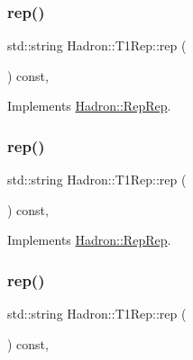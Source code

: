 \subsubsection{\texorpdfstring{rep()}{rep()}\hspace{0.1cm}{\footnotesize\ttfamily [1/5]}}
{\footnotesize\ttfamily std\+::string Hadron\+::\+T1\+Rep\+::rep (\begin{DoxyParamCaption}{ }\end{DoxyParamCaption}) const\hspace{0.3cm}{\ttfamily [inline]}, {\ttfamily [virtual]}}



Implements \mbox{\hyperlink{structHadron_1_1RepRep_ab3213025f6de249f7095892109575fde}{Hadron\+::\+Rep\+Rep}}.

\mbox{\label{structHadron_1_1T1Rep_ad64cbc6c40d059a9cee94bab5f8614ce}} 
\subsubsection{\texorpdfstring{rep()}{rep()}\hspace{0.1cm}{\footnotesize\ttfamily [2/5]}}
{\footnotesize\ttfamily std\+::string Hadron\+::\+T1\+Rep\+::rep (\begin{DoxyParamCaption}{ }\end{DoxyParamCaption}) const\hspace{0.3cm}{\ttfamily [inline]}, {\ttfamily [virtual]}}



Implements \mbox{\hyperlink{structHadron_1_1RepRep_ab3213025f6de249f7095892109575fde}{Hadron\+::\+Rep\+Rep}}.

\mbox{\label{structHadron_1_1T1Rep_ad64cbc6c40d059a9cee94bab5f8614ce}} 
\subsubsection{\texorpdfstring{rep()}{rep()}\hspace{0.1cm}{\footnotesize\ttfamily [3/5]}}
{\footnotesize\ttfamily std\+::string Hadron\+::\+T1\+Rep\+::rep (\begin{DoxyParamCaption}{ }\end{DoxyParamCaption}) const\hspace{0.3cm}{\ttfamily [inline]}, {\ttfamily [virtual]}}



